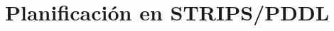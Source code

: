 \documentclass[a4paper,12pt]{article}
\title{Planificación en STRIPS/PDDL}
\makeatletter
\let\newtitle\@title
\makeatother
\begin{document}
\textcolor{UnirDark}{\LARGE\bfseries\newtitle}



% 
% 
\end{document}
